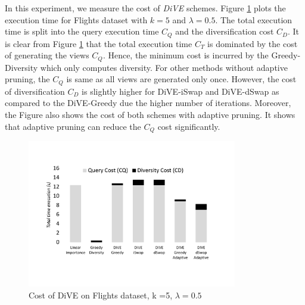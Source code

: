 


{}
In this experiment, we measure the cost of {\em DiVE} schemes. Figure \ref{fig:cost_flights} plots the execution time for Flights dataset with $k = 5$ and $\lambda = 0.5$. The total execution time is split into the query execution time $C_Q$ and the diversification cost $C_D$. It is clear from Figure \ref{fig:cost_flights} that the total execution time $C_T$ is dominated by the cost of generating the views $C_Q$. Hence, the minimum cost is incurred by the Greedy-Diversity which only computes diversity. For other methods without adaptive pruning, the $C_Q$ is same as all views are generated only once. However, the cost of diversification $C_D$ is slightly higher for DiVE-iSwap and DiVE-dSwap as compared to the DiVE-Greedy due the higher number of iterations. Moreover, the Figure also shows the cost of both schemes with adaptive pruning. It shows that adaptive pruning can reduce the $C_Q$ cost significantly.



\begin{figure}[t]
	\vspace{-30pt}
	\includegraphics[width=3.6in]{figures/results/flight_costs_all}
	\vspace{-50pt}
	\caption{Cost of DiVE on Flights dataset, k =5, $\lambda = 0.5$ }
	\label{fig:cost_flights}
\end{figure}




